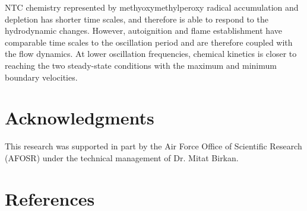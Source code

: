 \documentclass[review,3p,times]{elsarticle}
\begin{document}
\textcolor{Rev1}{NTC chemistry represented by methyoxymethylperoxy radical accumulation and depletion has shorter time scales, and therefore is able to respond to the hydrodynamic changes.  However, autoignition and flame establishment have comparable time scales to the oscillation period and are therefore coupled with the flow dynamics.  At lower oscillation frequencies, chemical kinetics is closer to reaching the two steady-state conditions with the maximum and minimum boundary velocities.}

\section*{Acknowledgments}
This research was supported in part by the Air Force Office of Scientific Research (AFOSR) under the technical management of Dr. Mitat Birkan.


\section*{References}



\renewcommand{\thefigure}{\arabic{figure}}
\renewcommand{\thetable}{\arabic{table}}

\clearpage
\end{document}
